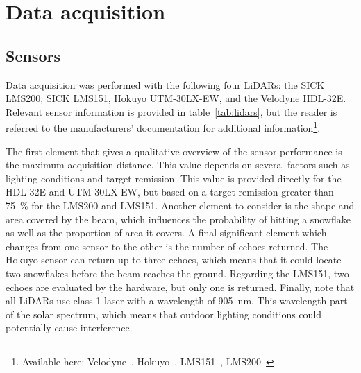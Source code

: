 \section{Data acquisition}

\subsection{Sensors}

Data acquisition was performed with the following four LiDARs: the SICK LMS200, SICK LMS151, Hokuyo UTM-30LX-EW, and the Velodyne HDL-32E. Relevant sensor information is provided in table~\ref{tab:lidars}, but the reader is referred to the manufacturers' documentation for additional information\footnote{Available here: Velodyne~\cite{VelodyneManual}, Hokuyo~\cite{UTMDatasheet}, LMS151~\cite{LMS151Datasheet}, LMS200~\cite{LMS200Manual}}. 

The first element that gives a qualitative overview of the sensor performance is the maximum acquisition distance. This value depends on several factors such as lighting conditions and target remission. This value is provided directly for the HDL-32E and UTM-30LX-EW, but based on a target remission greater than \SI{75}{\percent} for the LMS200 and LMS151. Another element to consider is the shape and area covered by the beam, which influences the probability of hitting a snowflake as well as the proportion of area it covers. A final significant element which changes from one sensor to the other is the number of echoes returned. The Hokuyo sensor can return up to three echoes, which means that it could locate two snowflakes before the beam reaches the ground. Regarding the LMS151, two echoes are evaluated by the hardware, but only one is returned. Finally, note that all LiDARs use class 1 laser with a wavelength of \SI{905}{\nano\meter}. This wavelength part of the solar spectrum, which means that outdoor lighting conditions could potentially cause interference.


